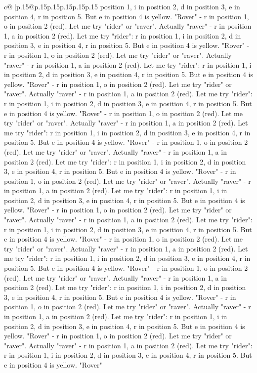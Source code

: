 \documentclass{article}
\begin{document}
{\begin{supertabular}{c@{$\;$}|p{.15\linewidth}@{}p{.15\linewidth}p{.15\linewidth}p{.15\linewidth}p{.15\linewidth}p{.15\linewidth}}
{{{position 1, i in position 2, d in position 3, e in position 4, r in position 5. But e in position 4 is yellow. "Rover" {-} r in position 1, o in position 2 (red). Let me try "rider" or "raver". Actually "raver" {-} r in position 1, a in position 2 (red). Let me try "rider": r in position 1, i in position 2, d in position 3, e in position 4, r in position 5. But e in position 4 is yellow. "Rover" {-} r in position 1, o in position 2 (red). Let me try "rider" or "raver". Actually "raver" {-} r in position 1, a in position 2 (red). Let me try "rider": r in position 1, i in position 2, d in position 3, e in position 4, r in position 5. But e in position 4 is yellow. "Rover" {-} r in position 1, o in position 2 (red). Let me try "rider" or "raver". Actually "raver" {-} r in position 1, a in position 2 (red). Let me try "rider": r in position 1, i in position 2, d in position 3, e in position 4, r in position 5. But e in position 4 is yellow. "Rover" {-} r in position 1, o in position 2 (red). Let me try "rider" or "raver". Actually "raver" {-} r in position 1, a in position 2 (red). Let me try "rider": r in position 1, i in position 2, d in position 3, e in position 4, r in position 5. But e in position 4 is yellow. "Rover" {-} r in position 1, o in position 2 (red). Let me try "rider" or "raver". Actually "raver" {-} r in position 1, a in position 2 (red). Let me try "rider": r in position 1, i in position 2, d in position 3, e in position 4, r in position 5. But e in position 4 is yellow. "Rover" {-} r in position 1, o in position 2 (red). Let me try "rider" or "raver". Actually "raver" {-} r in position 1, a in position 2 (red). Let me try "rider": r in position 1, i in position 2, d in position 3, e in position 4, r in position 5. But e in position 4 is yellow. "Rover" {-} r in position 1, o in position 2 (red). Let me try "rider" or "raver". Actually "raver" {-} r in position 1, a in position 2 (red). Let me try "rider": r in position 1, i in position 2, d in position 3, e in position 4, r in position 5. But e in position 4 is yellow. "Rover" {-} r in position 1, o in position 2 (red). Let me try "rider" or "raver". Actually "raver" {-} r in position 1, a in position 2 (red). Let me try "rider": r in position 1, i in position 2, d in position 3, e in position 4, r in position 5. But e in position 4 is yellow. "Rover" {-} r in position 1, o in position 2 (red). Let me try "rider" or "raver". Actually "raver" {-} r in position 1, a in position 2 (red). Let me try "rider": r in position 1, i in position 2, d in position 3, e in position 4, r in position 5. But e in position 4 is yellow. "Rover" {-} r in position 1, o in position 2 (red). Let me try "rider" or "raver". Actually "raver" {-} r in position 1, a in position 2 (red). Let me try "rider": r in position 1, i in position 2, d in position 3, e in position 4, r in position 5. But e in position 4 is yellow. "Rover" {-} r in position 1, o in position 2 (red). Let me try "rider" or "raver". Actually "raver" {-} r in position 1, a in position 2 (red). Let me try "rider": r in position 1, i in position 2, d in position 3, e in position 4, r in position 5. But e in position 4 is yellow. "Rover" }}}
\end{supertabular}}
\end{document}
